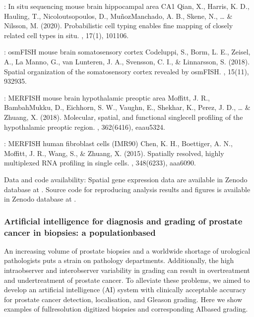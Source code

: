 \documentclass[letterpaper,10pt,english,openany,oneside]{sphinxmanual}
\begin{document}
\sphinxAtStartPar
{}

\sphinxAtStartPar
{}: In situ sequencing mouse brain hippocampal area CA1 Qian, X., Harris, K. D., Hauling, T., Nicoloutsopoulos, D., Muñoz\sphinxhyphen{}Manchado, A. B., Skene, N., … \& Nilsson, M. (2020). Probabilistic cell typing enables fine mapping of closely related cell types in situ. , 17(1), 101\sphinxhyphen{}106.

\sphinxAtStartPar
{}: osmFISH mouse brain somatosensory cortex Codeluppi, S., Borm, L. E., Zeisel, A., La Manno, G., van Lunteren, J. A., Svensson, C. I., \& Linnarsson, S. (2018). Spatial organization of the somatosensory cortex revealed by osmFISH. , 15(11), 932\sphinxhyphen{}935.

\sphinxAtStartPar
{}: MERFISH mouse brain hypothalamic preoptic area Moffitt, J. R., Bambah\sphinxhyphen{}Mukku, D., Eichhorn, S. W., Vaughn, E., Shekhar, K., Perez, J. D., … \& Zhuang, X. (2018). Molecular, spatial, and functional single\sphinxhyphen{}cell profiling of the hypothalamic preoptic region. , 362(6416), eaau5324.

\sphinxAtStartPar
{}: MERFISH human fibroblast cells (IMR90) Chen, K. H., Boettiger, A. N., Moffitt, J. R., Wang, S., \& Zhuang, X. (2015). Spatially resolved, highly multiplexed RNA profiling in single cells. , 348(6233), aaa6090.

\sphinxAtStartPar
Data and code availability: Spatial gene expression data are available in Zenodo database at .
Source code for reproducing analysis results and figures is available in Zenodo database at .


\subsubsection{Artificial intelligence for diagnosis and grading of prostate cancer in biopsies: a population\sphinxhyphen{}based}
\label{\detokenize{docs/starting/projects:artificial-intelligence-for-diagnosis-and-grading-of-prostate-cancer-in-biopsies-a-population-based}}
\sphinxAtStartPar
An increasing volume of prostate biopsies and a worldwide shortage of urological pathologists puts a
strain on pathology departments. Additionally, the high intra\sphinxhyphen{}observer and inter\sphinxhyphen{}observer variability in grading can
result in overtreatment and undertreatment of prostate cancer. To alleviate these problems, we aimed to develop an
artificial intelligence (AI) system with clinically acceptable accuracy for prostate cancer detection, localisation, and
Gleason grading. Here we show examples of full\sphinxhyphen{}resolution digitized biopsies and corresponding AI\sphinxhyphen{}based grading.
\end{document}
